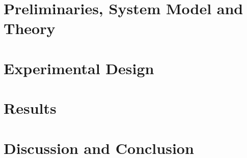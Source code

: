 \documentclass[12pt,oneside,openany]{report}
\begin{document}
\chapter{Preliminaries, System Model and Theory}


\chapter{Experimental Design}


\chapter{Results}


\chapter{Discussion and Conclusion}


\printbibliography
{}
\end{document}
